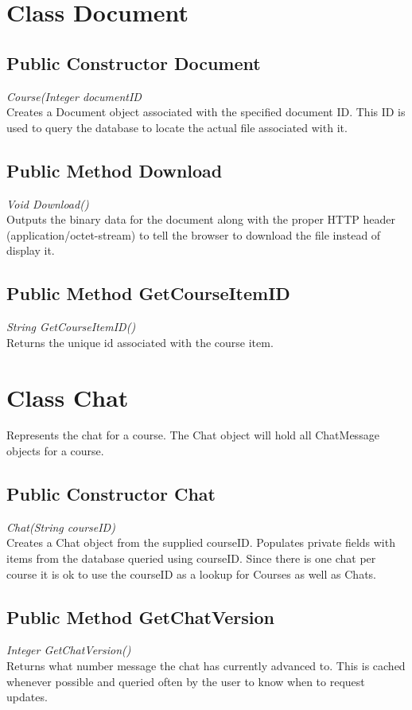 \documentclass[16pt]{scrreprt}
\begin{document}
\section{Class Document}

\subsection{Public Constructor Document}
\textit{Course(Integer documentID} \\
Creates a Document object associated with the specified document ID. This ID is used to query the database to locate the actual file associated with it.

\subsection{Public Method Download}
\textit{Void Download()} \\
Outputs the binary data for the document along with the proper HTTP header (application/octet-stream) to tell the browser to download the file instead of display it.

\subsection{Public Method GetCourseItemID}
\textit{String GetCourseItemID()} \\
Returns the unique id associated with the course item.

\section{Class Chat}
Represents the chat for a course. The Chat object will hold all ChatMessage objects for a course.

\subsection{Public Constructor Chat}
\textit{Chat(String courseID)} \\
Creates a Chat object from the supplied courseID. Populates private fields with items from the database queried using courseID. Since there is one chat per course it is ok to use the courseID as a lookup for Courses as well as Chats.

\subsection{Public Method GetChatVersion}
\textit{Integer GetChatVersion()} \\
Returns what number message the chat has currently advanced to. This is cached whenever possible and queried often by the user to know when to request updates.
\end{document}
